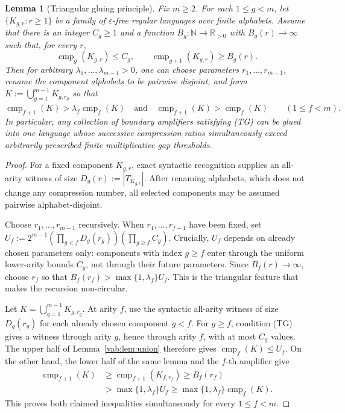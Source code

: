 \documentclass[10pt,a4paper]{article}
\newtheorem{lemma}[theorem]{Lemma}
\theoremstyle{definition}
\theoremstyle{remark}
\newcommand{\cmp}{\operatorname{cmp}}
\begin{document}
\begin{lemma}[Triangular gluing principle]
\label{vab:lem:triangular-gluing}
Fix \(m\ge2\).  For each \(1\le g<m\), let
\(\{K_{g,r}:r\ge1\}\) be a family of \(\varepsilon\)-free regular languages
over finite alphabets.  Assume that there is an integer \(C_g\ge1\) and a
function \(B_g:\mathbb N\to\mathbb R_{>0}\) with
\(B_g(r)\to\infty\) such that, for every \(r\),
\[
 \cmp_g(K_{g,r})\le C_g,
 \qquad
 \cmp_{g+1}(K_{g,r})\ge B_g(r).
 \tag{TG}
\]
Then for arbitrary \(\lambda_1,\ldots,\lambda_{m-1}>0\), one can choose
parameters \(r_1,\ldots,r_{m-1}\), rename the component alphabets to be
pairwise disjoint, and form
\(K:=\bigcup_{g=1}^{m-1}K_{g,r_g}\)
so that
\(\cmp_{f+1}(K)>\lambda_f\cmp_f(K) \quad\text{and}\quad \cmp_{f+1}(K)>\cmp_f(K) \qquad(1\le f<m).\)
In particular, any collection of boundary amplifiers satisfying \textup{(TG)}
can be glued into one language whose successive compression ratios
simultaneously exceed arbitrarily prescribed finite multiplicative gap
thresholds.
\end{lemma}

\begin{proof}
For a fixed component \(K_{g,r}\), exact syntactic recognition supplies an
all-arity witness of size
\(D_g(r):=|T_{K_{g,r}}|.\)
After renaming alphabets, which does not change any compression number, all
selected components may be assumed pairwise alphabet-disjoint.

Choose \(r_1,\ldots,r_{m-1}\) recursively.  When
\(r_1,\ldots,r_{f-1}\) have been fixed, set
\(U_f := 2^{m-1} \left(\prod_{g<f}D_g(r_g)\right) \left(\prod_{g\ge f}C_g\right).\)
Crucially, \(U_f\) depends on already chosen parameters only: components with
index \(g\ge f\) enter through the uniform lower-arity bounds \(C_g\), not
through their future parameters.  Since \(B_f(r)\to\infty\), choose \(r_f\)
so that
\(B_f(r_f)>\max\{1,\lambda_f\}U_f.\)
This is the triangular feature that makes the recursion non-circular.

Let \(K=\bigcup_{g=1}^{m-1}K_{g,r_g}\).  At arity \(f\), use the syntactic
all-arity witness of size \(D_g(r_g)\) for each already chosen component
\(g<f\).  For \(g\ge f\), condition \textup{(TG)} gives a witness through
arity \(g\), hence through arity \(f\), with at most \(C_g\) values.
The upper half of Lemma~\ref{vab:lem:union} therefore gives
\(\cmp_f(K)\le U_f.\)
On the other hand, the lower half of the same lemma and the \(f\)-th amplifier
give
\[
\begin{aligned}
 \cmp_{f+1}(K)
 &\ge \cmp_{f+1}(K_{f,r_f})
 \ge B_f(r_f)\\
 &>\max\{1,\lambda_f\}U_f
 \ge\max\{1,\lambda_f\}\cmp_f(K).
\end{aligned}
\]
This proves both claimed inequalities simultaneously for every
\(1\le f<m\).
\end{proof}
\end{document}
